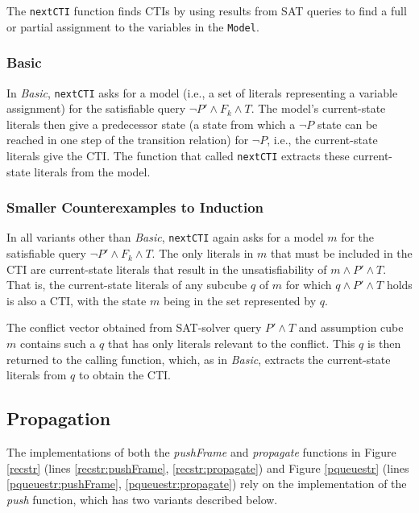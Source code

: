 \documentclass[12pt,a4paper,twoside,openright]{report}
\begin{document}
{{The \verb,nextCTI, function finds CTIs by
using results from SAT queries to find a full or partial assignment to
the variables in the \verb,Model,.

\subsubsection{Basic}
In \emph{Basic}, \verb,nextCTI, asks for a model
(i.e., a set of literals representing a variable assignment)
for the satisfiable query $\neg P' \wedge F_k \wedge T$.
The model's current-state literals then give a predecessor state (a state from which
a $\neg P$ state can be reached in one step of the transition relation) for $\neg P$,
i.e., the current-state literals give the CTI.
The function that called \verb,nextCTI, extracts these current-state literals from the model.

\subsubsection{Smaller Counterexamples to Induction}
In all variants other than {\it Basic},
\verb,nextCTI, again asks for a model $m$
for the satisfiable query $\neg P' \wedge F_k \wedge T$. The only literals in $m$ that
must be included in the CTI are current-state literals that result in
the unsatisfiability of $m \wedge P' \wedge T$. That is, the current-state literals of any
subcube $q$ of $m$ for which $q \wedge P' \wedge T$ holds is also a CTI, with
the state $m$ being in the set represented by $q$.

The conflict vector obtained from SAT-solver query $P' \wedge T$ and assumption
cube $m$ contains such a $q$ that has only literals relevant to the conflict. This $q$ is
then returned to the calling function, which, as in \emph{Basic}, extracts
the current-state literals from $q$ to obtain the CTI.


\subsection{Propagation}
\label{impl:propagation}
The implementations of both the {\it pushFrame} and {\it propagate} functions
in Figure \ref{recstr} (lines \ref{recstr:pushFrame},
\ref{recstr:propagate}) and
Figure \ref{pqueuestr} (lines \ref{pqueuestr:pushFrame}, \ref{pqueuestr:propagate})
rely on the implementation of the
{\it push} function, which has two variants described below.

}}
\end{document}
